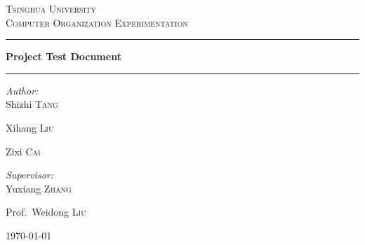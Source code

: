 \documentclass[11pt,utf8]{article}
\begin{document}
	
	\newcommand{\hlink}[1]{
		\footnote{\href{#1}{\textsl{\underline{#1}}}}
	}
	\renewenvironment{proof}{\noindent{\textbf{证明：}}}{\hfill $\square$ \vskip 4mm}
	\newtheorem*{theorem*}{定理}
	\newcommand{\theorem}[1]{
		\begin{theorem*}\textup{#1}\end{theorem*}
	}
	\let\enumerate\compactenum
	\let\endenumerate\endcompactenum
	\let\itemize\compactitem
	\let\enditemize\endcompactitem
	\setlength{\pltopsep}{5pt}
	\setlength{\parindent}{2em}
	\setlength{\footskip}{30pt}
	\setlength{\baselineskip}{1.3\baselineskip}
	\renewcommand\arraystretch{1.2}
	
	
	\begin{titlepage}
		\fancyhead[CH]{}
		
		\hspace{3.0cm}
		\begin{center}
			\vfill
			
			\textsc{\LARGE Tsinghua University}\\[0.8cm]
			
			\textsc{\Large Computer Organization Experimentation}\\[2.5cm]
			
			
			\rule[0.75\baselineskip]{0.75\textwidth}{1pt}
			
			{ \huge \bfseries Project Test Document}\\[0.4cm]
			
			\rule[15\baselineskip]{0.75\textwidth}{1pt}
			
			\begin{minipage}{0.4\textwidth}
				\begin{flushleft} \large
					\emph{Author:}\\
					Shizhi \textsc{Tang}
					
					Xihang \textsc{Liu}
					
					Zixi \textsc{Cai}
				\end{flushleft}
			\end{minipage}
			\begin{minipage}{0.4\textwidth}
				\begin{flushright} \large
					\emph{Supervisor:} \\
					Yuxiang \textsc{Zhang}
					
					Prof.~Weidong \textsc{Liu}
				\end{flushright}
			\end{minipage}
			
			\vfill
			\vspace{3.0cm}
			{\large \today}
			
		\end{center}
		
	\end{titlepage}
	\renewcommand{\headrulewidth}{0.4pt}
	\setcounter{page}{2}
	\tableofcontents
	\newpage
	
\end{document}
